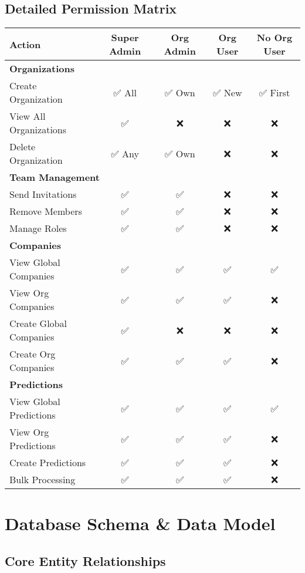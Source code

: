 \documentclass[a4paper,12pt]{article}
\newcommand{\sectionbreak}{\clearpage}
\begin{document}
\subsection*{Detailed Permission Matrix}
\begin{tabular}{lcccc}
\toprule
\textbf{Action} & \textbf{Super Admin} & \textbf{Org Admin} & \textbf{Org User} & \textbf{No Org User} \\
\midrule
\multicolumn{5}{l}{\textbf{Organizations}} \\
Create Organization & ✅ All & ✅ Own & ✅ New & ✅ First \\
View All Organizations & ✅ & ❌ & ❌ & ❌ \\
Delete Organization & ✅ Any & ✅ Own & ❌ & ❌ \\
\multicolumn{5}{l}{\textbf{Team Management}} \\
Send Invitations & ✅ & ✅ & ❌ & ❌ \\
Remove Members & ✅ & ✅ & ❌ & ❌ \\
Manage Roles & ✅ & ✅ & ❌ & ❌ \\
\multicolumn{5}{l}{\textbf{Companies}} \\
View Global Companies & ✅ & ✅ & ✅ & ✅ \\
View Org Companies & ✅ & ✅ & ✅ & ❌ \\
Create Global Companies & ✅ & ❌ & ❌ & ❌ \\
Create Org Companies & ✅ & ✅ & ✅ & ❌ \\
\multicolumn{5}{l}{\textbf{Predictions}} \\
View Global Predictions & ✅ & ✅ & ✅ & ✅ \\
View Org Predictions & ✅ & ✅ & ✅ & ❌ \\
Create Predictions & ✅ & ✅ & ✅ & ❌ \\
Bulk Processing & ✅ & ✅ & ✅ & ❌ \\
\bottomrule
\end{tabular}

\sectionbreak

\section*{Database Schema \& Data Model}

\subsection*{Core Entity Relationships}
\end{document}
